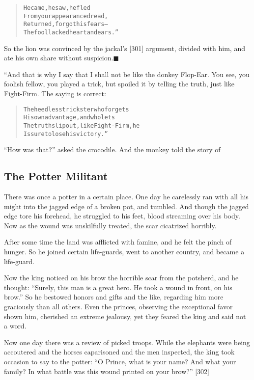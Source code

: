 \documentclass[article, twoside, 14pt]{memoir}
\newcommand{\qed}{\hfill \ensuremath{\blacksquare}}
\renewenvironment{verbatim}{%
\begin{quote}%
\vskip -10pt%
\begin{alltt}\normalfont\large}{\end{alltt}%
\end{quote}%
\vskip -10pt
} %
\begin{document}
\begin{verbatim}
He came, he saw, he fled
From your appearance dread,
Returned, forgot his fears--
The fool lacked heart and ears.”
\end{verbatim}
So the lion was convinced by the jackal's [301] argument, divided
with him, and ate his own share without
suspicion.\hyperref[s68]{\qed}

“And that is why I say that I shall not be like the donkey
Flop-Ear. You see, you foolish fellow, you played a trick, but
spoiled it by telling the truth, just like Fight-Firm. The saying
is correct:

\begin{verbatim}
The heedless trickster who forgets
His own advantage, and who lets
The truth slip out, like Fight-Firm, he
Is sure to lose his victory.”
\end{verbatim}
``How was that?'' asked the crocodile. And the monkey told the
story of

\subsection{The Potter Militant}

\label{s69}

There was once a potter in a certain place. One day he carelessly
ran with all his might into the jagged edge of a broken pot, and
tumbled. And though the jagged edge tore his forehead, he struggled
to his feet, blood streaming over his body. Now as the wound was
unskilfully treated, the scar cicatrized horribly.

After some time the land was afflicted with famine, and he felt the
pinch of hunger. So he joined certain life-guards, went to another
country, and became a life-guard.

Now the king noticed on his brow the horrible scar from the
potsherd, and he thought:
``Surely, this man is a great hero. He took a wound in front, on his brow.''
So he bestowed honors and gifts and the like, regarding him more
graciously than all others. Even the princes, observing the
exceptional favor shown him, cherished an extreme jealousy, yet
they feared the king and said not a word.

Now one day there was a review of picked troops. While the
elephants were being accoutered and the horses caparisoned and the
men inspected, the king took occasion to say to the potter:
``O Prince, what is your name? And what your family? In what battle was this wound printed on your brow?''
[302]
\end{document}
